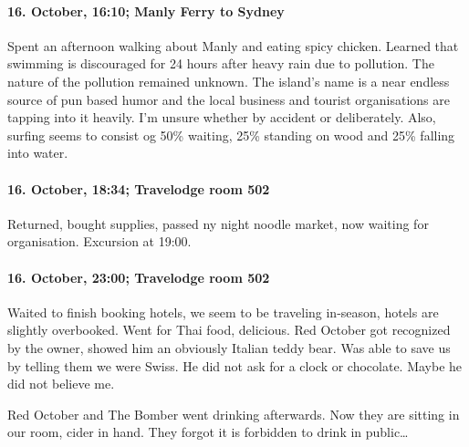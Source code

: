 \paragraph{16. October, 16:10; Manly Ferry to Sydney}
Spent an afternoon walking about Manly and eating spicy chicken.
Learned that swimming is discouraged for 24 hours after heavy rain due to pollution.
The nature of the pollution remained unknown.
The island's name is a near endless source of pun based humor and the local business and tourist organisations are tapping into it heavily.
I'm unsure whether by accident or deliberately.
Also, surfing seems to consist og 50\% waiting, 25\% standing on wood and 25\% falling into water.

\paragraph{16. October, 18:34; Travelodge room 502}
Returned, bought supplies, passed ny night noodle market, now waiting for organisation.
Excursion at 19:00.

\paragraph{16. October, 23:00; Travelodge room 502}
Waited to finish booking hotels, we seem to be traveling in-season, hotels are slightly overbooked.
Went for Thai food, delicious.
Red October got recognized by the owner, showed him an obviously Italian teddy bear.
Was able to save us by telling them we were Swiss.
He did not ask for a clock or chocolate.
Maybe he did not believe me.

Red October and The Bomber went drinking afterwards.
Now they are sitting in our room, cider in hand.
They forgot it is forbidden to drink in public\ldots{}
